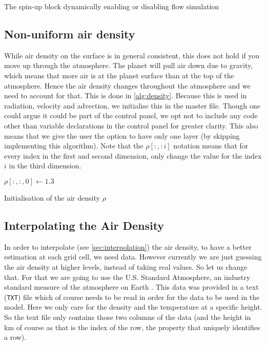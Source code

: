 \begin{algorithm}
    \caption{The spin-up block dynamically enabling or disabling flow simulation}
    \label{alg:spinup}
\end{algorithm}

\subsection{Non-uniform air density}
While air density on the surface is in general consistent, this does not hold if you move up through the atmosphere. The planet will pull air down due to gravity, which means that more air is at 
the planet surface than at the top of the atmosphere. Hence the air density changes throughout the atmosphere and we need to account for that. This is done in \autoref{alg:density}. Because this 
is used in radiation, velocity and advection, we initialise this in the master file. Though one could argue it could be part of the control panel, we opt not to include any code other than 
variable declarations in the control panel for greater clarity. This also means that we give the user the option to have only one layer (by skipping implementing this algorithm). Note that the 
$\rho[:,: i]$ notation means that for every index in the first and second dimension, only change the value for the index $i$ in the third dimension.

\begin{algorithm}
    $\rho[:, :, 0] \leftarrow 1.3$ \;
    \caption{Initialisation of the air density $\rho$}
    \label{alg:density}
\end{algorithm}

\subsection{Interpolating the Air Density}
In order to interpolate (see \autoref{sec:interpolation}) the air density, to have a better estimation at each grid cell, we need data. However currently we are just guessing the air density at 
higher levels, instead of taking real values. So let us change that. For that we are going to use the U.S. Standard Atmosphere, an industry standard measure of the atmosphere on Earth 
\cite{usatmosp}. This data was provided in a text (\texttt{TXT}) file which of course needs to be read in order for the data to be used in the model. Here we only care for the density and the 
temperature at a specific height. So the text file only contains those two columns of the data (and the height in km of course as that is the index of the row, the property that uniquely 
identifies a row).

